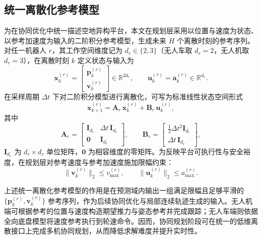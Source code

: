 \subsection{统一离散化参考模型}\label{subsec:unified_disc_model}

为在协同优化中统一描述空地异构平台，本文在规划层采用以位置与速度为状态、以参考加速度为输入的二阶积分参考模型，生成未来 \(H\) 个离散时刻的参考序列。对任一机器人 \(r\)，其工作空间维度记为 \(d_r\in\{2,3\}\)（无人车取 \(d_r=2\)，无人机取 \(d_r=3\)），在离散时刻 \(k\) 定义状态与输入为
\begin{equation}
\mathbf{x}_k^{(r)}=
\begin{bmatrix}
\mathbf{p}_k^{(r)}\\[2pt]
\mathbf{v}_k^{(r)}
\end{bmatrix}\in\mathbb{R}^{2d_r},\qquad
\mathbf{u}_k^{(r)}=\mathbf{a}_k^{(r)}\in\mathbb{R}^{d_r}.
\label{eq:unified_state_input}
\end{equation}
在采样周期 \(\Delta t\) 下对二阶积分模型进行离散化，可写为标准线性状态空间形式
\begin{equation}
\mathbf{x}_{k+1}^{(r)}=\mathbf{A}_r\,\mathbf{x}_k^{(r)}+\mathbf{B}_r\,\mathbf{u}_k^{(r)},
\label{eq:disc_AB_ref}
\end{equation}
其中
\begin{equation}
\mathbf{A}_r=
\begin{bmatrix}
\mathbf{I}_{d_r} & \Delta t\,\mathbf{I}_{d_r}\\
\mathbf{0} & \mathbf{I}_{d_r}
\end{bmatrix},\qquad
\mathbf{B}_r=
\begin{bmatrix}
\tfrac{1}{2}\Delta t^{2}\mathbf{I}_{d_r}\\
\Delta t\,\mathbf{I}_{d_r}
\end{bmatrix},
\label{eq:AB_mats}
\end{equation}
\(\mathbf{I}_{d_r}\) 为 \(d_r\times d_r\) 单位矩阵，\(\mathbf{0}\) 为相容维度的零矩阵。为反映平台可执行性与安全裕度，在规划层对参考速度与参考加速度施加限幅约束：
\begin{equation}
\big\|\mathbf{v}_k^{(r)}\big\|_2 \le v_{\max}^{(r)},\qquad
\big\|\mathbf{u}_k^{(r)}\big\|_2 \le a_{\max}^{(r)}.
\label{eq:norm_limits}
\end{equation}

上述统一离散化参考模型的作用是在预测域内输出一组满足限幅且足够平滑的
\(\{\mathbf{p}_k^{(r)},\mathbf{v}_k^{(r)}\}\) 参考序列，作为后续协同优化与局部连续轨迹生成的输入。无人机端可根据参考的位置与速度构造期望推力与姿态参考并完成跟踪；无人车端则依据全向底盘模型将速度参考执行到轮速命令。因而，协同规划阶段可在统一的低维离散接口上完成多机协同规划，从而降低求解难度并提升实时性。

